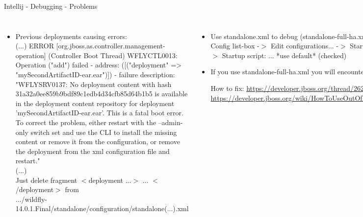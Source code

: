 \documentclass[aspectratio=1610,english]{beamer} %
\begin{document}
	\begin{frame}{Intellij - Debugging - Problems}
		\begin{columns}
				\begin{itemize}
					\tiny
					\color{black}
					\item Previous deployments causing errors: \\
						\color{red}
						\fontsize{3}{4} \selectfont	
						(...) ERROR [org.jboss.as.controller.management-operation] (Controller Boot Thread) WFLYCTL0013: \\
						Operation ("add") failed - address: ([("deployment" => "mySecondArtifactID-ear.ear")]) - failure description: \\ 
						"WFLYSRV0137: No deployment content with hash 31a32a0ee859b9bdf89c1edb4d34cfb85d64b1b5 is available in the deployment content repository for deployment 'mySecondArtifactID-ear.ear'. This is a fatal boot error. To correct the problem, either restart with the --admin-only switch set and use the CLI to install the missing content or remove it from the configuration, or remove the deployment from the xml configuration file and restart." \\
						(...) \\
					\color{gray}
					\tiny
					Just delete fragment $<$deployment ...$>$ ... $<$/deployment$>$ from \\
					\fontsize{3}{4} \selectfont	
					.../wildfly-14.0.1.Final/standalone/configuration/standalone(...).xml \\ 
					\usebox\configurationStandaloneErrorBox
				\end{itemize}
				
				\begin{itemize}	
					\tiny
					\color{black}
					\item Use standalone.xml to debug (standalone-full-ha.xml doesn't work for me) \\ 
						\color{gray}
						\fontsize{4}{5} \selectfont 
						Config list-box -$>$ Edit configurations... -$>$ Startup/Connections -$>$ Debug -$>$ Startup script: ... *use default* (checked) \\
					
					\color{red}
					\tiny
					\item If you use standalone-full-ha.xml you will encounter error: \\ 
						\usebox\DebugStandaloneFullHAErrorBox
						
						\color{gray}
						\fontsize{4}{5} \selectfont 
						How to fix: \url{https://developer.jboss.org/thread/262233?_sscc=t} \\ 
						\url{https://developer.jboss.org/wiki/HowToUseOutOfProcessActiveMQWithWildFly}
				\end{itemize}
		\end{columns}
	\end{frame}
\end{document}
